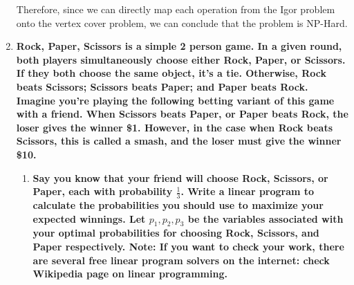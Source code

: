 \documentclass{article}
\begin{document}
\begin{enumerate}
Therefore, since we can directly map each operation from the Igor problem onto the vertex cover problem, we can conclude that the problem is NP-Hard.









% 

\newpage
\item \textbf{Rock, Paper, Scissors is a simple 2 person game. In a given round, both players simultaneously choose either Rock, Paper, or Scissors. If they both choose the same object, it's a tie. Otherwise, Rock beats Scissors; Scissors beats Paper; and Paper beats Rock. Imagine you're playing the following betting variant of this game with a friend. When Scissors beats Paper, or Paper beats Rock, the loser gives the winner \$1. However, in the case when Rock beats Scissors, this is called a smash, and the loser must give the winner \$10.}

\begin{enumerate}
\item \textbf{Say you know that your friend will choose Rock, Scissors, or Paper, each with probability $\frac{1}{3}$. Write a linear program to calculate the probabilities you should use to maximize your expected winnings. Let $p_1,p_2,p_3$ be the variables associated with your optimal probabilities for choosing Rock, Scissors, and Paper respectively. Note: If you want to check your work, there are several free linear program solvers on the internet: check Wikipedia page on linear programming.} \\





\end{enumerate}
\end{enumerate}
\end{document}
